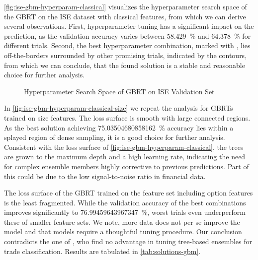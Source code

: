 \cref{fig:ise-gbm-hyperparam-classical} visualizes the hyperparameter search space of the \gls{GBRT} on the \gls{ISE} dataset with classical features, from which we can derive several observations. First, hyperparameter tuning has a significant impact on the prediction, as the validation accuracy varies between \SI{58.429}{\percent} and \SI{64.378}{\percent} for different trials. Second, the best hyperparameter combination, marked with \bestcircle, lies off-the-borders surrounded by other promising trials, indicated by the contours, from which we can conclude, that the found solution is a stable and reasonable choice for further analysis.

\begin{figure}[!h]
    \vfill
    \caption[Hyperparameter Search Space of Gradient-Boosting]{Hyperparameter Search Space of \gls{GBRT} on \gls{ISE} Validation Set}
    \label{fig:ise-gbm-hyperparam}
\end{figure}
\clearpage
\begin{figure}[!ht]
    \ContinuedFloat
\end{figure}

In \cref{fig:ise-gbm-hyperparam-classical-size} we repeat the analysis for \glspl{GBRT} trained on size features. The loss surface is smooth with large connected regions. As the best solution achieving \SI{75.03504680858162}{\percent} accuracy lies within a splayed region of dense sampling, it is a good choice for further analysis. Consistent with the loss surface of \cref{fig:ise-gbm-hyperparam-classical}, the trees are grown to the maximum depth and a high learning rate, indicating the need for complex ensemble members highly corrective to previous predictions. Part of this could be due to the low signal-to-noise ratio in financial data.

The loss surface of the \gls{GBRT} trained on the feature set including option features is the least fragmented. While the validation accuracy of the best combinations improves significantly to \SI{76.99459643967347}{\percent}, worst trials even underperform these of smaller feature sets. We note, more data does not per se improve the model and that models require a thoughtful tuning procedure. Our conclusion contradicts the one of \textcite[\checkmark][14]{ronenMachineLearningTrade2022}, who find no advantage in tuning tree-based ensembles for trade classification. Results are tabulated in \cref{tab:solutions-gbm}.

